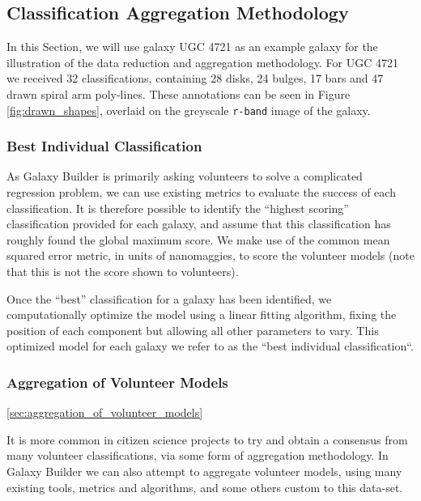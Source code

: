 \documentclass[../main.tex]{subfiles}
\begin{document}
\subsection{Classification Aggregation Methodology}

In this Section, we will use galaxy UGC 4721 as an example galaxy for the illustration of the data reduction and aggregation methodology. For UGC 4721 we received 32 classifications, containing 28 disks, 24 bulges, 17 bars and 47 drawn spiral arm poly-lines. These annotations can be seen in Figure \ref{fig:drawn_shapes}, overlaid on the greyscale \texttt{r-band} image of the galaxy.

\subsubsection{Best Individual Classification}

As Galaxy Builder is primarily asking volunteers to solve a complicated regression problem, we can use existing metrics to evaluate the success of each classification. It is therefore possible to identify the ``highest scoring'' classification provided for each galaxy, and assume that this classification has roughly found the global maximum score. We make use of the common mean squared error metric, in units of nanomaggies, to score the volunteer models (note that this is not the score shown to volunteers).

Once the ``best'' classification for a galaxy has been identified, we computationally optimize the model using a linear fitting algorithm, fixing the position of each component but allowing all other parameters to vary. This optimized model for each galaxy we refer to as the ``best individual classification``.

\subsubsection{Aggregation of Volunteer Models}
\ref{sec:aggregation_of_volunteer_models}

It is more common in citizen science projects to try and obtain a consensus from many volunteer classifications, via some form of aggregation methodology. In Galaxy Builder we can also attempt to aggregate volunteer models, using many existing tools, metrics and algorithms, and some others custom to this data-set.
\end{document}
